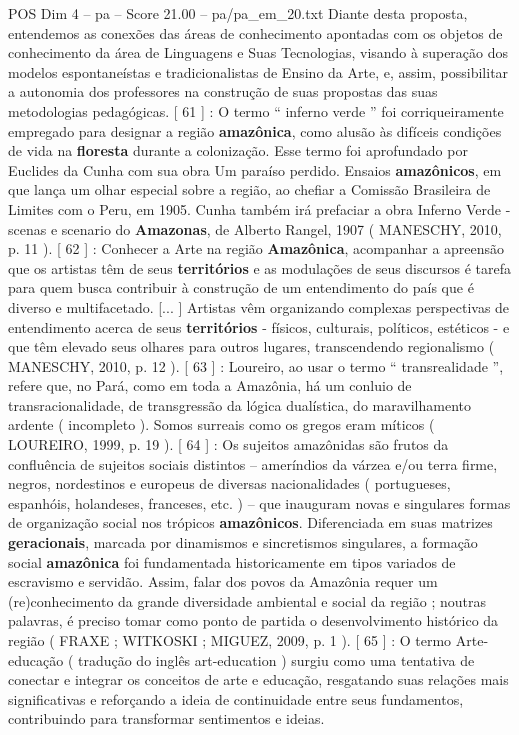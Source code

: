 \begin{textsample}{POS Dim 4 – pa – Score 21.00 – pa/pa\_em\_20.txt}
Diante desta proposta, entendemos as conexões das áreas de conhecimento apontadas com os objetos de conhecimento da área de Linguagens e Suas Tecnologias, visando à superação dos modelos espontaneístas e tradicionalistas de Ensino da Arte, e, assim, possibilitar a autonomia dos professores na construção de suas propostas das suas metodologias pedagógicas. [ 61 ] : O termo “ inferno verde ” foi corriqueiramente empregado para designar a região \textbf{amazônica}, como alusão às difíceis condições de vida na \textbf{floresta} durante a colonização.
Esse termo foi aprofundado por Euclides da Cunha com sua obra Um paraíso perdido.
Ensaios \textbf{amazônicos}, em que lança um olhar especial sobre a região, ao chefiar a Comissão Brasileira de Limites com o Peru, em 1905.
Cunha também irá prefaciar a obra Inferno Verde - scenas e scenario do \textbf{Amazonas}, de Alberto Rangel, 1907 ( MANESCHY, 2010, p. 11 ). [ 62 ] : Conhecer a Arte na região \textbf{Amazônica}, acompanhar a apreensão que os artistas têm de seus \textbf{territórios} e as modulações de seus discursos é tarefa para quem busca contribuir à construção de um entendimento do país que é diverso e multifacetado. [... ] Artistas vêm organizando complexas perspectivas de entendimento acerca de seus \textbf{territórios} - físicos, culturais, políticos, estéticos - e que têm elevado seus olhares para outros lugares, transcendendo regionalismo ( MANESCHY, 2010, p. 12 ). [ 63 ] : Loureiro, ao usar o termo “ transrealidade ”, refere que, no Pará, como em toda a Amazônia, há um conluio de transracionalidade, de transgressão da lógica dualística, do maravilhamento ardente ( incompleto ).
Somos surreais como os gregos eram míticos ( LOUREIRO, 1999, p. 19 ). [ 64 ] : Os sujeitos amazônidas são frutos da confluência de sujeitos sociais distintos – ameríndios da várzea e/ou terra firme, negros, nordestinos e europeus de diversas nacionalidades ( portugueses, espanhóis, holandeses, franceses, etc. ) – que inauguram novas e singulares formas de organização social nos trópicos \textbf{amazônicos}.
Diferenciada em suas matrizes \textbf{geracionais}, marcada por dinamismos e sincretismos singulares, a formação social \textbf{amazônica} foi fundamentada historicamente em tipos variados de escravismo e servidão.
Assim, falar dos povos da Amazônia requer um (re)conhecimento da grande diversidade ambiental e social da região ; noutras palavras, é preciso tomar como ponto de partida o desenvolvimento histórico da região ( FRAXE ; WITKOSKI ; MIGUEZ, 2009, p. 1 ). [ 65 ] : O termo Arte-educação ( tradução do inglês art-education ) surgiu como uma tentativa de conectar e integrar os conceitos de arte e educação, resgatando suas relações mais significativas e reforçando a ideia de continuidade entre seus fundamentos, contribuindo para transformar sentimentos e ideias.

\end{textsample}

